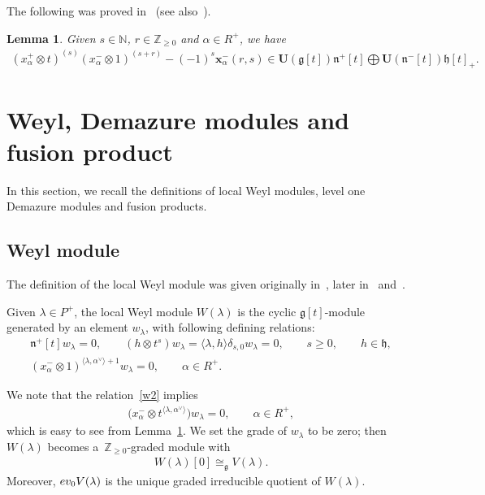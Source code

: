 \documentclass[11pt]{article}
\newtheorem{lemma}{Lemma}
\numberwithin{equation}{section}
\begin{document}
The following was proved in~\cite{G} (see also~\cite[Lemma 2.3]{CV}).
\begin{lemma}\label{garland}
Given $s\in\mathbb{N}$, $r\in\mathbb{Z}_{\geq0}$ and $\alpha\in R^{+}$, we have
\begin{gather*}
(x^{+}_{\alpha} \otimes t)^{(s)}(x^{-}_{\alpha} \otimes
1)^{(s+r)}-(-1)^s\mathbf{x}^{-}_{\alpha}(r,s)\in\mathbf{U}(\mathfrak{g}[t])\mathfrak{n}^{+}[t]\bigoplus
\mathbf{U}(\mathfrak{n}^{-}[t])\mathfrak{h}[t]_{+}.
\end{gather*}
\end{lemma}

\section{Weyl, Demazure modules and fusion product}\label{section3}

In this section, we recall the def\/initions of local Weyl modules, level one Demazure modules and fusion products.

\subsection{Weyl module}\label{section3.1}

The def\/inition of the local Weyl module was given originally in~\cite{CP}, later in~\cite{CFK} and~\cite{FL}.
\begin{definition}
Given $\lambda \in P^+$, the local Weyl module $W(\lambda)$ is the cyclic $\mathfrak{g}[t]$-module generated by an
element $w_\lambda$, with following def\/ining relations:
\begin{gather}
\mathfrak{n}^{+}[t]  w_\lambda=0,
\qquad
(h \otimes t^s)  w_\lambda = \langle \lambda, h \rangle \delta_{s,0} w_\lambda=0,
\qquad
s\geq0,
\qquad
h\in\mathfrak{h},
\nonumber
\\
(x^{-}_\alpha \otimes 1)^{\langle \lambda,
\alpha^{\vee} \rangle + 1}w_\lambda=0,
\qquad
\alpha \in R^{+}.
\label{w2}
\end{gather}
\end{definition}
\noindent We note that the relation~\eqref{w2} implies
\begin{gather}
\label{w2'}
\big(x^{-}_\alpha \otimes t^{\langle \lambda,
\alpha^{\vee} \rangle}\big)  w_\lambda=0,
\qquad
\alpha \in R^{+},
\end{gather}
which is easy to see from Lemma~\ref{garland}.
We set the grade of $w_\lambda$ to be zero; then $W(\lambda)$ becomes a~$\mathbb{Z}_{\geq 0}$-graded module with
\begin{gather*}
W(\lambda)[0] \cong_{\mathfrak{g}} V(\lambda).
\end{gather*}
Moreover, $\textup{ev}_0 V(\lambda)$ is the unique graded irreducible quotient of $W(\lambda)$.
\end{document}
